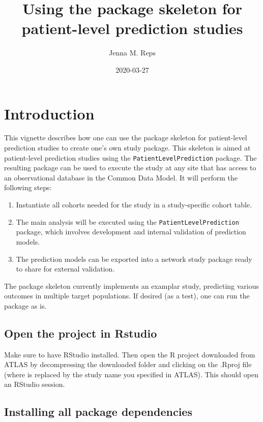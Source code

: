 \documentclass[
]{article}
\title{Using the package skeleton for patient-level prediction studies}
\author{Jenna M. Reps}
\date{2020-03-27}
\providecommand{\tightlist}{%
  \setlength{\itemsep}{0pt}\setlength{\parskip}{0pt}}
\begin{document}
\maketitle

{
\setcounter{tocdepth}{2}
\tableofcontents
}
\hypertarget{introduction}{%
\section{Introduction}\label{introduction}}

This vignette describes how one can use the package skeleton for
patient-level prediction studies to create one's own study package. This
skeleton is aimed at patient-level prediction studies using the
\texttt{PatientLevelPrediction} package. The resulting package can be
used to execute the study at any site that has access to an
observational database in the Common Data Model. It will perform the
following steps:

\begin{enumerate}
\def\labelenumi{\arabic{enumi}.}
\tightlist
\item
  Instantiate all cohorts needed for the study in a study-specific
  cohort table.
\item
  The main analysis will be executed using the
  \texttt{PatientLevelPrediction} package, which involves development
  and internal validation of prediction models.
\item
  The prediction models can be exported into a network study package
  ready to share for external validation.
\end{enumerate}

The package skeleton currently implements an examplar study, predicting
various outcomes in multiple target populations. If desired (as a test),
one can run the package as is.

\hypertarget{open-the-project-in-rstudio}{%
\subsection{Open the project in
Rstudio}\label{open-the-project-in-rstudio}}

Make sure to have RStudio installed. Then open the R project downloaded
from ATLAS by decompressing the downloaded folder and clicking on the
.Rproj file (where is replaced by the study name you specified in
ATLAS). This should open an RStudio session.

\hypertarget{installing-all-package-dependencies}{%
\subsection{Installing all package
dependencies}\label{installing-all-package-dependencies}}
\end{document}
